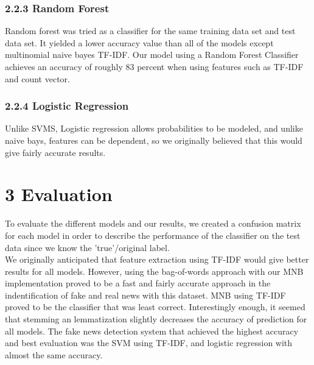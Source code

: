 \documentclass{neu_handout}
\begin{document}
\subsubsection*{2.2.3 Random Forest}

Random forest was tried as a classifier for the same training data set and test data set. It
yielded a lower accuracy value than all of the models except multinomial naive bayes TF-IDF. Our model using a Random Forest Classifier achieves an accuracy of roughly 83 percent when using features such as TF-IDF and count vector.
 
 
\subsubsection*{2.2.4 Logistic Regression}
Unlike SVMS, Logistic regression allows probabilities to be modeled, and unlike naive bays, features can be dependent, so we originally believed that this would give fairly accurate results.

\section*{3 Evaluation}

To evaluate the different models and our results, we created a confusion matrix for each model in order to describe the performance of the classifier on the test data since we know the 'true'/original label.\\

We originally anticipated that feature extraction using TF-IDF would give better results for all models. However, using the bag-of-words approach with our MNB implementation proved to be a fast and fairly accurate approach in the indentification of fake and real news with this dataset. MNB using TF-IDF proved to be the classifier that was least correct. Interestingly enough, it seemed that stemming an lemmatization slightly decreases the accuracy of prediction for all models. The fake news detection system that achieved the highest accuracy and best evaluation was the SVM using TF-IDF, and logistic regression with almost the same accuracy.
\end{document}
